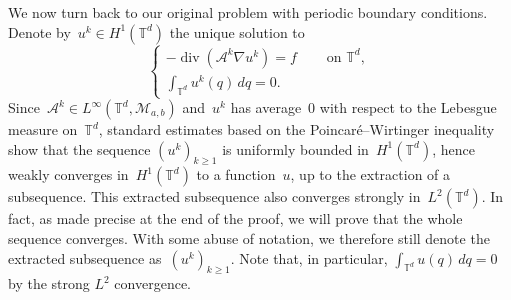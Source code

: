 \documentclass{article}
\renewcommand{\leq}{\leqslant}
\renewcommand{\geq}{\geqslant}
\def\T{\mathbb{T}}
\newcommand{\A}{\mathcal{A}}
\renewcommand{\dim}{d}
\begin{document}
We now turn back to our original problem with periodic boundary conditions. Denote by~$u^k\in H^1(\T^\dim)$ the unique solution to 
\begin{equation}
  \label{eq:periodic-bnd-pbm}
  \left\{\begin{aligned}
  -\operatorname{div}\left(\A^k\nabla u^k\right) = f & \quad \text{ on }\T^\dim, \\ 
  \int_{\T^\dim}u^k(q) \, dq = 0.&
  \end{aligned}\right.
\end{equation}
Since~$\A^k \in L^\infty(\T^\dim,\mathcal{M}_{a,b})$ and~$u^k$ has average~0 with respect to the Lebesgue measure on~$\T^\dim$, standard estimates based on the Poincar\'e--Wirtinger inequality show that the sequence $(u^k)_{k\geq 1}$ is uniformly bounded in~$H^1(\T^\dim)$, hence weakly converges in~$H^1(\T^\dim)$ to a function~$u$, up to the extraction of a subsequence. This extracted subsequence also converges strongly in~$L^2(\T^\dim)$. In fact, as made precise at the end of the proof, we will prove that the whole sequence converges. With some abuse of notation, we therefore still denote the extracted subsequence as~$(u^k)_{k\geq 1}$.
Note that, in particular, $\int_{\T^\dim}u(q) \, dq = 0$ by the strong $L^2$ convergence. 
\end{document}
